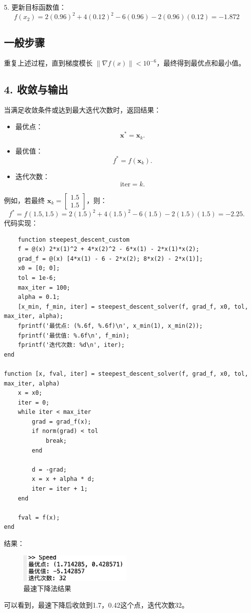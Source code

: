 \documentclass[12pt,a4paper,oneside]{article}
\begin{document}
5. 更新目标函数值：
\[
f(x_2) = 2(0.96)^2 + 4(0.12)^2 - 6(0.96) - 2(0.96)(0.12) = -1.872
\]

\subsection*{一般步骤}
重复上述过程，直到梯度模长 $\|\nabla f(x)\| < 10^{-6}$，最终得到最优点和最小值。

\subsection*{4. 收敛与输出}
当满足收敛条件或达到最大迭代次数时，返回结果：
\begin{itemize}
    \item 最优点：
    \[
    \mathbf{x}^* = \mathbf{x}_k.
    \]
    \item 最优值：
    \[
    f^* = f(\mathbf{x}_k).
    \]
    \item 迭代次数：
    \[
    \text{iter} = k.
    \]
\end{itemize}
例如，若最终 \(\mathbf{x}_k = \begin{bmatrix}1.5 \\ 1.5\end{bmatrix}\)，则：
\[
f^* = f(1.5, 1.5) = 2(1.5)^2 + 4(1.5)^2 - 6(1.5) - 2(1.5)(1.5) = -2.25.
\]
代码实现：
\begin{lstlisting}
    function steepest_descent_custom
    f = @(x) 2*x(1)^2 + 4*x(2)^2 - 6*x(1) - 2*x(1)*x(2); 
    grad_f = @(x) [4*x(1) - 6 - 2*x(2); 8*x(2) - 2*x(1)];
    x0 = [0; 0];       
    tol = 1e-6;        
    max_iter = 100;   
    alpha = 0.1;       
    [x_min, f_min, iter] = steepest_descent_solver(f, grad_f, x0, tol, max_iter, alpha);
    fprintf('最优点: (%.6f, %.6f)\n', x_min(1), x_min(2));
    fprintf('最优值: %.6f\n', f_min);
    fprintf('迭代次数: %d\n', iter);
end

function [x, fval, iter] = steepest_descent_solver(f, grad_f, x0, tol, max_iter, alpha)
    x = x0;
    iter = 0;
    while iter < max_iter
        grad = grad_f(x);
        if norm(grad) < tol
            break; 
        end

        d = -grad; 
        x = x + alpha * d; 
        iter = iter + 1;
    end

    fval = f(x); 
end
\end{lstlisting}

结果：
\begin{figure}[H]
    \centering
    \includegraphics[width=0.5\textwidth]{image/1.png}
    \caption{最速下降法结果}
\end{figure}
可以看到，最速下降后收敛到1.7，0.42这个点，迭代次数32。
\end{document}
